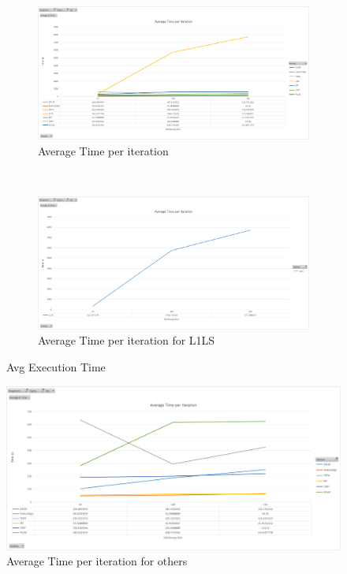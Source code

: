 \documentclass{article} %
\begin{document}
\begin{figure}[H]
        \centering
        \begin{subfigure}[b]{0.5\textwidth}
                \includegraphics[width=\textwidth]{images/graph3}
                \caption{Average Time per iteration}
                \label{fig:avgTime}
        \end{subfigure}%
        ~ %
        \begin{subfigure}[b]{0.5\textwidth}
                \includegraphics[width=\textwidth]{images/graph4}
                \caption{Average Time per iteration for L1LS}
                \label{fig:avgTimeL1LS}
        \end{subfigure}
        \caption{Avg Execution Time}\label{fig:avgExecTime}
\end{figure}


\begin{figure}[H]
	\includegraphics[width=\textwidth]{images/graph5}
    \caption{Average Time per iteration for others}
    \label{fig:avgTimeOthers}
\end{figure}
\end{document}
